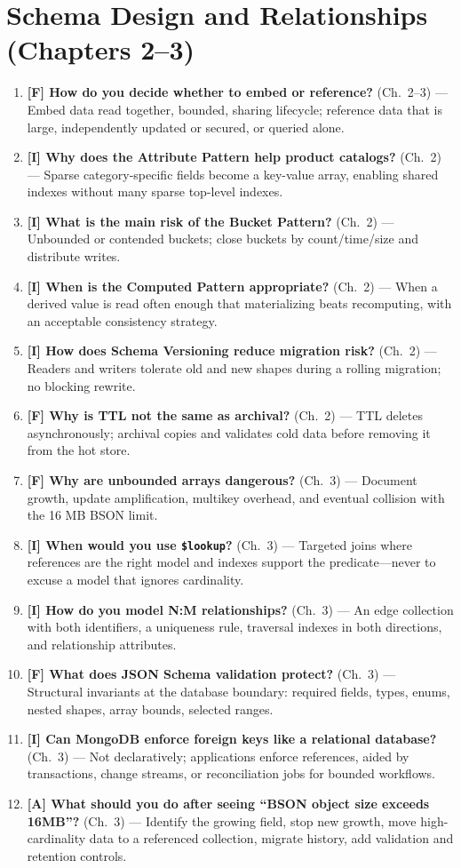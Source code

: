 \section{Schema Design and Relationships (Chapters 2--3)}
\begin{enumerate}
    \item \textbf{[F] How do you decide whether to embed or reference?} (Ch.~2--3) --- Embed data read together, bounded, sharing lifecycle; reference data that is large, independently updated or secured, or queried alone.
    \item \textbf{[I] Why does the Attribute Pattern help product catalogs?} (Ch.~2) --- Sparse category-specific fields become a key-value array, enabling shared indexes without many sparse top-level indexes.
    \item \textbf{[I] What is the main risk of the Bucket Pattern?} (Ch.~2) --- Unbounded or contended buckets; close buckets by count/time/size and distribute writes.
    \item \textbf{[I] When is the Computed Pattern appropriate?} (Ch.~2) --- When a derived value is read often enough that materializing beats recomputing, with an acceptable consistency strategy.
    \item \textbf{[I] How does Schema Versioning reduce migration risk?} (Ch.~2) --- Readers and writers tolerate old and new shapes during a rolling migration; no blocking rewrite.
    \item \textbf{[F] Why is TTL not the same as archival?} (Ch.~2) --- TTL deletes asynchronously; archival copies and validates cold data before removing it from the hot store.
    \item \textbf{[F] Why are unbounded arrays dangerous?} (Ch.~3) --- Document growth, update amplification, multikey overhead, and eventual collision with the 16 MB BSON limit.
    \item \textbf{[I] When would you use \texttt{\$lookup}?} (Ch.~3) --- Targeted joins where references are the right model and indexes support the predicate---never to excuse a model that ignores cardinality.
    \item \textbf{[I] How do you model N:M relationships?} (Ch.~3) --- An edge collection with both identifiers, a uniqueness rule, traversal indexes in both directions, and relationship attributes.
    \item \textbf{[F] What does JSON Schema validation protect?} (Ch.~3) --- Structural invariants at the database boundary: required fields, types, enums, nested shapes, array bounds, selected ranges.
    \item \textbf{[I] Can MongoDB enforce foreign keys like a relational database?} (Ch.~3) --- Not declaratively; applications enforce references, aided by transactions, change streams, or reconciliation jobs for bounded workflows.
    \item \textbf{[A] What should you do after seeing ``BSON object size exceeds 16MB''?} (Ch.~3) --- Identify the growing field, stop new growth, move high-cardinality data to a referenced collection, migrate history, add validation and retention controls.
\end{enumerate}

